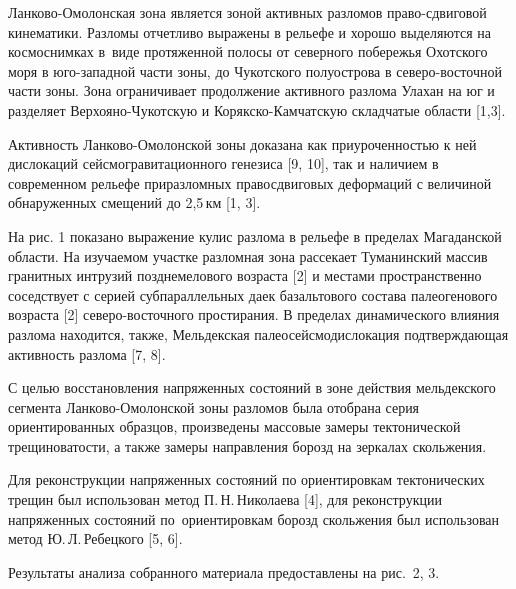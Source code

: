 



\makeProcTitleII



Ланково-Омолонская зона является зоной активных разломов право-сдвиговой
кинематики. Разломы отчетливо выражены в рельефе и хорошо выделяются на космоснимках
в~виде протяженной полосы от северного побережья Охотского моря в юго-западной
части зоны, до Чукотского полуострова в северо-восточной части зоны.
Зона ограничивает продолжение активного разлома Улахан на юг и разделяет
Верхояно-Чукотскую и Корякско-Камчатскую складчатые области [1,3].


Активность Ланково-Омолонской зоны доказана как приуроченностью к ней
дислокаций сейсмогравитационного генезиса [9, 10], так и наличием в современном рельефе приразломных правосдвиговых деформаций
с величиной обнаруженных смещений до 2,5\,км [1, 3].

На рис. 1 показано выражение кулис разлома в рельефе в пределах Магаданской области.
На изучаемом участке разломная зона рассекает Туманинский массив
гранитных интрузий позднемелового возраста [2]
и местами пространственно соседствует с серией субпараллельных даек
базальтового состава палеогенового возраста [2] северо-восточного простирания.
В пределах динамического влияния разлома находится, также, Мельдекская
палеосейсмодислокация подтверждающая активность разлома [7, 8].


\clearpage
С целью восстановления напряженных состояний в зоне действия мельдекского
сегмента Ланково-Омолонской зоны разломов была отобрана серия ориентированных
образцов, произведены массовые замеры тектонической трещиноватости, а также
замеры направления борозд  на зеркалах скольжения.

Для реконструкции напряженных состояний по ориентировкам тектонических трещин был использован метод П.\,Н.\,Николаева [4], для реконструкции напряженных состояний по~ориентировкам борозд скольжения был использован метод Ю.\,Л.\,Ребецкого [5, 6].

Результаты анализа собранного материала предоставлены на рис.~2, 3.

